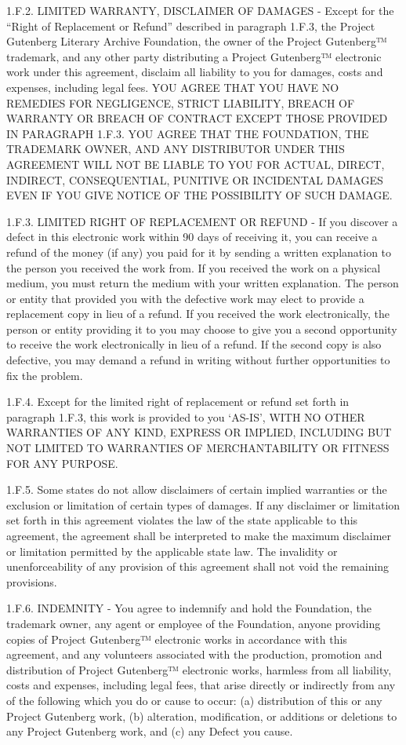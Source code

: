 \documentclass[12pt,openright]{book}
\begin{document}
1.F.2. LIMITED WARRANTY, DISCLAIMER OF DAMAGES - Except for the “Right of Replacement or Refund” described in paragraph 1.F.3, the Project Gutenberg Literary Archive Foundation, the owner of the Project Gutenberg™ trademark, and any other party distributing a Project Gutenberg™ electronic work under this agreement, disclaim all liability to you for damages, costs and expenses, including legal fees. YOU AGREE THAT YOU HAVE NO REMEDIES FOR NEGLIGENCE, STRICT LIABILITY, BREACH OF WARRANTY OR BREACH OF CONTRACT EXCEPT THOSE PROVIDED IN PARAGRAPH 1.F.3. YOU AGREE THAT THE FOUNDATION, THE TRADEMARK OWNER, AND ANY DISTRIBUTOR UNDER THIS AGREEMENT WILL NOT BE LIABLE TO YOU FOR ACTUAL, DIRECT, INDIRECT, CONSEQUENTIAL, PUNITIVE OR INCIDENTAL DAMAGES EVEN IF YOU GIVE NOTICE OF THE POSSIBILITY OF SUCH DAMAGE.

1.F.3. LIMITED RIGHT OF REPLACEMENT OR REFUND - If you discover a defect in this electronic work within 90 days of receiving it, you can receive a refund of the money (if any) you paid for it by sending a written explanation to the person you received the work from. If you received the work on a physical medium, you must return the medium with your written explanation. The person or entity that provided you with the defective work may elect to provide a replacement copy in lieu of a refund. If you received the work electronically, the person or entity providing it to you may choose to give you a second opportunity to receive the work electronically in lieu of a refund. If the second copy is also defective, you may demand a refund in writing without further opportunities to fix the problem.

1.F.4. Except for the limited right of replacement or refund set forth in paragraph 1.F.3, this work is provided to you ‘AS-IS’, WITH NO OTHER WARRANTIES OF ANY KIND, EXPRESS OR IMPLIED, INCLUDING BUT NOT LIMITED TO WARRANTIES OF MERCHANTABILITY OR FITNESS FOR ANY PURPOSE.

1.F.5. Some states do not allow disclaimers of certain implied warranties or the exclusion or limitation of certain types of damages. If any disclaimer or limitation set forth in this agreement violates the law of the state applicable to this agreement, the agreement shall be interpreted to make the maximum disclaimer or limitation permitted by the applicable state law. The invalidity or unenforceability of any provision of this agreement shall not void the remaining provisions.

1.F.6. INDEMNITY - You agree to indemnify and hold the Foundation, the trademark owner, any agent or employee of the Foundation, anyone providing copies of Project Gutenberg™ electronic works in accordance with this agreement, and any volunteers associated with the production, promotion and distribution of Project Gutenberg™ electronic works, harmless from all liability, costs and expenses, including legal fees, that arise directly or indirectly from any of the following which you do or cause to occur: (a) distribution of this or any Project Gutenberg work, (b) alteration, modification, or additions or deletions to any Project Gutenberg work, and (c) any Defect you cause.
\end{document}
